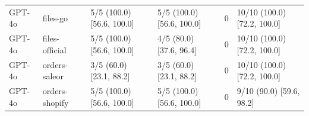 \begin{center}
\begin{longtable}{@{}llllll@{}}
GPT-4o & files-go & 5/5 (100.0) [56.6, 100.0] & 5/5 (100.0) [56.6, 100.0] & 0 & 10/10 (100.0) [72.2, 100.0] \\
GPT-4o & files-official & 5/5 (100.0) [56.6, 100.0] & 4/5 (80.0) [37.6, 96.4] & 0 & 10/10 (100.0) [72.2, 100.0] \\
GPT-4o & orders-saleor & 3/5 (60.0) [23.1, 88.2] & 3/5 (60.0) [23.1, 88.2] & 0 & 10/10 (100.0) [72.2, 100.0] \\
GPT-4o & orders-shopify & 5/5 (100.0) [56.6, 100.0] & 5/5 (100.0) [56.6, 100.0] & 0 & 9/10 (90.0) [59.6, 98.2] \\
\bottomrule
\end{longtable}\end{center}
